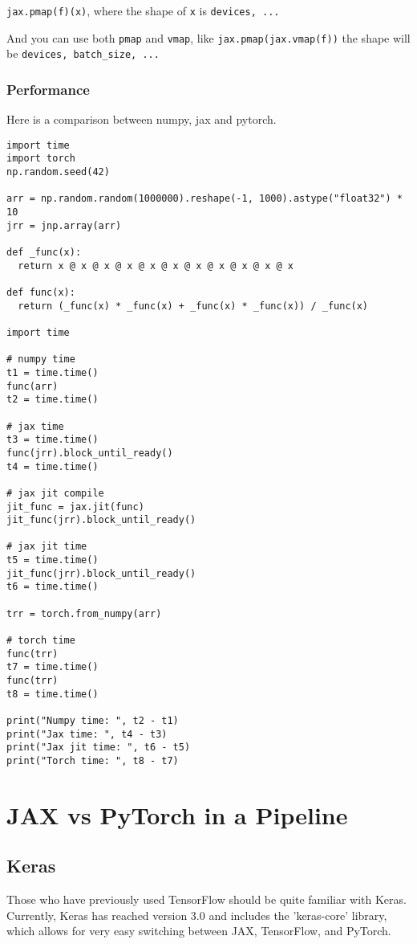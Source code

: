 \documentclass[11pt]{article}
\begin{document}
\texttt{jax.pmap(f)(x)}, where the shape of \texttt{x} is \texttt{devices, ...}

And you can use both \texttt{pmap} and \texttt{vmap}, like \texttt{jax.pmap(jax.vmap(f))} the shape will be \texttt{devices, batch\_size, ...}
\subsubsection{Performance}
\label{sec:org701dd44}

Here is a comparison between numpy, jax and pytorch.

\begin{verbatim}
import time
import torch
np.random.seed(42)

arr = np.random.random(1000000).reshape(-1, 1000).astype("float32") * 10
jrr = jnp.array(arr)

def _func(x):
  return x @ x @ x @ x @ x @ x @ x @ x @ x @ x @ x

def func(x):
  return (_func(x) * _func(x) + _func(x) * _func(x)) / _func(x)

import time

# numpy time
t1 = time.time()
func(arr)
t2 = time.time()

# jax time
t3 = time.time()
func(jrr).block_until_ready()
t4 = time.time()

# jax jit compile
jit_func = jax.jit(func)
jit_func(jrr).block_until_ready()

# jax jit time
t5 = time.time()
jit_func(jrr).block_until_ready()
t6 = time.time()

trr = torch.from_numpy(arr)

# torch time
func(trr)
t7 = time.time()
func(trr)
t8 = time.time()

print("Numpy time: ", t2 - t1)
print("Jax time: ", t4 - t3)
print("Jax jit time: ", t6 - t5)
print("Torch time: ", t8 - t7)
\end{verbatim}
\section{JAX vs PyTorch in a Pipeline}
\label{sec:org9c3562a}

\subsection{Keras}
\label{sec:org86c6d78}

Those who have previously used TensorFlow should be quite familiar with Keras. Currently, Keras has reached version 3.0 and includes the 'keras-core' library, which allows for very easy switching between JAX, TensorFlow, and PyTorch.
\end{document}
